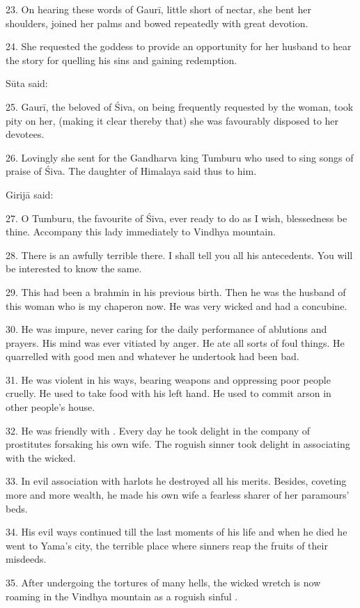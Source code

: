 23. On hearing these words of Gaurī, little short of nectar, she bent her
shoulders, joined her palms and bowed repeatedly with great devotion.

24. She requested the goddess to provide an opportunity for her husband to hear
the story for quelling his sins and gaining redemption.

Sūta said:

25. Gaurī, the beloved of Śiva, on being frequently requested by the woman,
took pity on her, (making it clear thereby that) she was favourably disposed to
her devotees.

26. Lovingly she sent for the Gandharva king Tumburu who used to sing songs of
praise of Śiva. The daughter of Himalaya said thus to him.

Girijā said:

27. O Tumburu, the favourite of Śiva, ever ready to do as I wish, blessedness be
thine. Accompany this lady immediately to Vindhya mountain.

28. There is an awfully terrible  there. I shall tell you all his
antecedents. You will be interested to know the same.

29. This  had been a brahmin in his previous birth. Then he was the
husband of this woman who is my chaperon now. He was very wicked and had a
 concubine.

30. He was impure, never caring for the daily performance of ablutions and
 prayers. His mind was ever vitiated by anger. He ate all sorts of
foul things. He quarrelled with good men and whatever he undertook had been bad.

31. He was violent in his ways, bearing weapons and oppressing poor people
cruelly. He used to take food with his left hand. He used to commit arson in
other people’s house.

32. He was friendly with . Every day he took delight in the company
of prostitutes forsaking his own wife. The roguish sinner took delight in
associating with the wicked.

33. In evil association with harlots he destroyed all his merits. Besides,
coveting more and more wealth, he made his own wife a fearless sharer of her
paramours’ beds.

34. His evil ways continued till the last moments of his life and when he died
he went to Yama’s city, the terrible place where sinners reap the fruits of
their misdeeds.

35. After undergoing the tortures of many hells, the wicked wretch is now
roaming in the Vindhya mountain as a roguish sinful .

